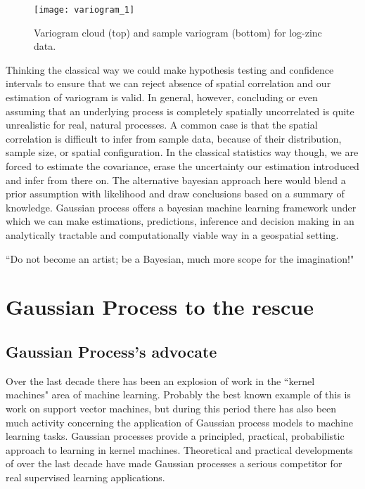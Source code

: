 \documentclass[12pt,a4paper,oneside]{book}
\theoremstyle{plain}
\theoremstyle{definition}
\begin{document}
{\begin{figure}[h]
\begin{center}
\texttt{[image: variogram\_1]}
\caption{Variogram cloud (top) and sample variogram (bottom) for log-zinc data.}
\end{center}
\end{figure}

\vspace{2mm}\noindent
Thinking the classical way we could make hypothesis testing and confidence intervals to ensure that we can reject absence of spatial correlation and our estimation of variogram is valid. In general, however, concluding or even assuming that an underlying process is completely spatially uncorrelated is quite unrealistic for real, natural processes. A common case is that the spatial correlation is difficult to infer from sample data, because of their distribution, sample size, or spatial configuration. In the classical statistics way though, we are forced to estimate the covariance, erase the uncertainty our estimation introduced and infer from there on. The alternative bayesian approach here would blend a prior assumption with likelihood and draw conclusions based on a summary of knowledge. Gaussian process offers a bayesian machine learning framework under which we can make estimations, predictions, inference and decision making in an analytically tractable and computationally viable way in a geospatial setting.  
\begin{savequote}[45mm] 
``Do not become an artist; be a Bayesian, much more scope for the imagination!"
\end{savequote}
\chapter{Gaussian Process to the rescue}

\section{Gaussian Process's advocate}
Over the last decade there has been an explosion of work in the ``kernel machines" area of machine learning. Probably the best known example of this is work on support vector machines, but during this period there has also been much activity concerning the application of Gaussian process models to machine learning tasks. Gaussian processes provide a principled, practical, probabilistic approach to learning in kernel machines. Theoretical and practical developments of over the last decade have made Gaussian processes a serious competitor for real supervised learning applications. 

}
\end{document}
